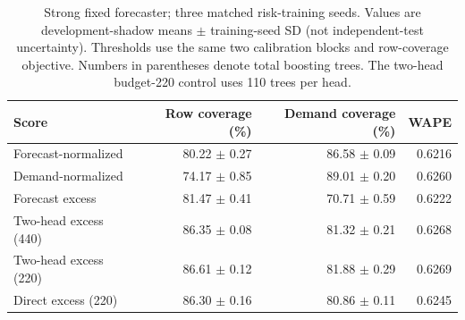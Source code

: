 \begin{table}[t]
\centering\small
\caption{Strong fixed forecaster; three matched risk-training seeds. Values are development-shadow means $\pm$ training-seed SD (not independent-test uncertainty). Thresholds use the same two calibration blocks and row-coverage objective. Numbers in parentheses denote total boosting trees. The two-head budget-220 control uses 110 trees per head.}
\label{tab:twohead}
\begin{tabular}{lrrr}\toprule
Score & Row coverage (\%) & Demand coverage (\%) & WAPE\\\midrule
Forecast-normalized & 80.22 $\pm$ 0.27 & 86.58 $\pm$ 0.09 & 0.6216 \\
Demand-normalized & 74.17 $\pm$ 0.85 & 89.01 $\pm$ 0.20 & 0.6260 \\
Forecast excess & 81.47 $\pm$ 0.41 & 70.71 $\pm$ 0.59 & 0.6222 \\
Two-head excess (440) & 86.35 $\pm$ 0.08 & 81.32 $\pm$ 0.21 & 0.6268 \\
Two-head excess (220) & 86.61 $\pm$ 0.12 & 81.88 $\pm$ 0.29 & 0.6269 \\
Direct excess (220) & 86.30 $\pm$ 0.16 & 80.86 $\pm$ 0.11 & 0.6245 \\
\bottomrule\end{tabular}
\end{table}

